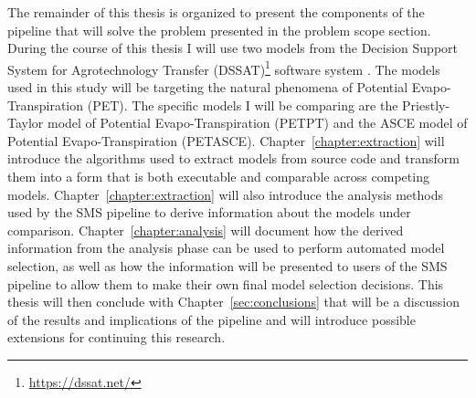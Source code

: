 The remainder of this thesis is organized to present the components of the pipeline that will solve the problem presented in the problem scope section.
During the course of this thesis I will use two models from the Decision Support System for Agrotechnology Transfer (DSSAT)\footnote{\url{https://dssat.net/}} software system \citep{DSSAT}.
The models used in this study will be targeting the natural phenomena of Potential Evapo-Transpiration (PET).
The specific models I will be comparing are the Priestly-Taylor model of Potential Evapo-Transpiration (PETPT) and the ASCE model of Potential Evapo-Transpiration (PETASCE).
Chapter~\ref{chapter:extraction} will introduce the algorithms used to extract models from source code and transform them into a form that is both executable and comparable across competing models.
Chapter~\ref{chapter:extraction} will also introduce the analysis methods used by the SMS pipeline to derive information about the models under comparison.
Chapter~\ref{chapter:analysis} will document how the derived information from the analysis phase can be used to perform automated model selection, as well as how the information will be presented to users of the SMS pipeline to allow them to make their own final model selection decisions.
This thesis will then conclude with Chapter~\ref{sec:conclusions} that will be a discussion of the results and implications of the pipeline and will introduce possible extensions for continuing this research.
